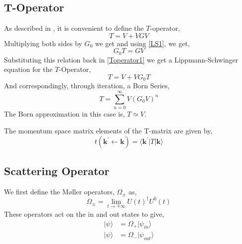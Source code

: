 \documentclass[a4paper,10pt]{report}
\begin{document}
\subsection{T-Operator}
As described in \cite{TaylorScattering}, it is convenient to define the $T$-operator,
\begin{equation}\label{Toperator1}
 T=V+VGV
\end{equation}
 Multiplying both sides by $G_0$ we get and using \eqref{LS1}, we get,
\begin{equation}\label{TOperatorRelation1}
 G_0T=GV
\end{equation}
 Substituting this relation back in \eqref{Toperator1} we get a Lippmann-Schwinger equation
for the $T$-Operator,
\begin{equation}\label{LS2}
 T=V+VG_0T
\end{equation}
 And correspondingly, through iteration, a Born Series,
\begin{equation}\label{BornSeriesToperator}
 T=\displaystyle\sum_{n=0}^{\infty}V\left(G_0V\right)^n
\end{equation}
The Born approximation in this case is, $T\simeq V$.

The momentum space matrix elements of the T-matrix are given by,
\begin{equation}\label{Tmatrixelements}
  t\left(\mathbf{k}^\prime\leftarrow\mathbf{k}\right)=\langle \mathbf{k}^\prime |T| \mathbf{k} \rangle
\end{equation}

\subsection{Scattering Operator}
We first define the Møller operators, $\Omega_\pm$ as,
\begin{equation}\label{moellerdef}
 \Omega_\pm = \displaystyle\lim_{t\rightarrow\mp\infty}U(t)^\dagger U^0(t)
\end{equation}
These operators act on the in and out states to give,
\begin{align}\label{moelleract}
 |\psi\rangle &=\Omega_+|\psi_{in}\rangle \\
 |\psi\rangle &=\Omega_-|\psi_{out}\rangle 
\end{align}
\end{document}
